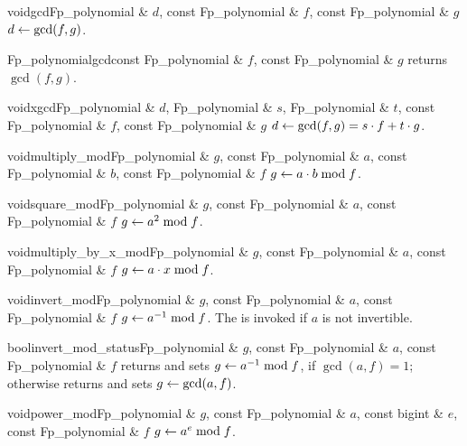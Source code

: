 
\begin{fcode}{void}{gcd}{Fp_polynomial & $d$, const Fp_polynomial & $f$, const Fp_polynomial & $g$}
  $d \leftarrow \gcd(f, g)$.
\end{fcode}

\begin{fcode}{Fp_polynomial}{gcd}{const Fp_polynomial & $f$, const Fp_polynomial & $g$}
  returns $\gcd(f, g)$.
\end{fcode}

\begin{fcode}{void}{xgcd}{Fp_polynomial & $d$, Fp_polynomial & $s$, Fp_polynomial & $t$,
    const Fp_polynomial & $f$, const Fp_polynomial & $g$}%
  $d \leftarrow \gcd(f, g) = s \cdot f + t \cdot g$.
\end{fcode}



\begin{fcode}{void}{multiply_mod}{Fp_polynomial & $g$, const Fp_polynomial & $a$,
    const Fp_polynomial & $b$, const Fp_polynomial & $f$}%
  $g \leftarrow a \cdot b \bmod f$.
\end{fcode}

\begin{fcode}{void}{square_mod}{Fp_polynomial & $g$, const Fp_polynomial & $a$, const Fp_polynomial & $f$}
  $g \leftarrow a^2 \bmod f$.
\end{fcode}

\begin{fcode}{void}{multiply_by_x_mod}{Fp_polynomial & $g$, const Fp_polynomial & $a$, const Fp_polynomial & $f$}
  $g \leftarrow a \cdot x \bmod f$.
\end{fcode}

\begin{fcode}{void}{invert_mod}{Fp_polynomial & $g$, const Fp_polynomial & $a$, const Fp_polynomial & $f$}
  $g \leftarrow a^{-1} \bmod f$.  The \LEH is invoked if $a$ is not invertible.
\end{fcode}

\begin{fcode}{bool}{invert_mod_status}{Fp_polynomial & $g$, const Fp_polynomial & $a$, const Fp_polynomial & $f$}
  returns \TRUE and sets $g \leftarrow a^{-1} \bmod f$, if $\gcd(a, f) = 1$; otherwise returns
  \FALSE and sets $g \leftarrow \gcd(a, f)$.
\end{fcode}

\begin{fcode}{void}{power_mod}{Fp_polynomial & $g$, const Fp_polynomial & $a$,
    const bigint & $e$, const Fp_polynomial & $f$}%
  $g \leftarrow a^e \bmod f$.
\end{fcode}


